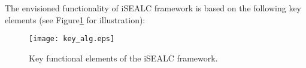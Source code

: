 \documentclass[letter,onecolumn,12pt]{aiaa-tc}
\newcommand{\1}{1_n}
\begin{document}
The envisioned functionality of iSEALC framework is based on the following key elements (see Figure\ref{fig:KeyAlg} for illustration):
%
\begin{figure}[thpb]
\centering
\vspace{-0mm}
\texttt{[image: key\_alg.eps]}
\caption{Key functional elements of the iSEALC framework.}
\label{fig:KeyAlg}
\end{figure}
\vspace{-1mm}

\end{document}
